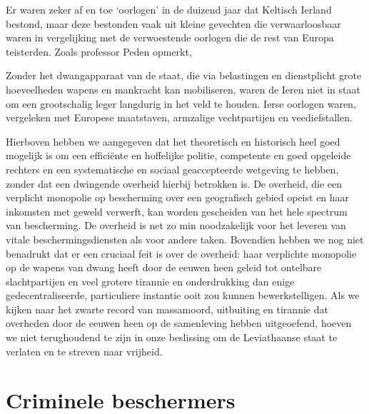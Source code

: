 \documentclass[
  a5paper,
  smalldemyvopaper,10pt,twoside,onecolumn,openright,extrafontsizes,hidelinks]{memoir}
\renewenvironment{quote}%
               {\list{}{\rightmargin=.6cm\leftmargin=.6cm}%
                \itshape \item[]}%
               {\endlist}
\begin{document}
Er waren zeker af en toe `oorlogen' in de duizend jaar dat Keltisch
Ierland bestond, maar deze bestonden vaak uit kleine gevechten die
verwaarloosbaar waren in vergelijking met de verwoestende oorlogen die
de rest van Europa teisterden. Zoals professor Peden opmerkt,

\begin{quote}
Zonder het dwangapparaat van de staat, die via belastingen en
dienstplicht grote hoeveelheden wapens en mankracht kan mobiliseren,
waren de Ieren niet in staat om een grootschalig leger langdurig in het
veld te houden. Ierse oorlogen waren, vergeleken met Europese
maatstaven, armzalige vechtpartijen en veediefstallen.
\end{quote}

Hierboven hebben we aangegeven dat het theoretisch en historisch heel
goed mogelijk is om een efficiënte en hoffelijke politie, competente en
goed opgeleide rechters en een systematische en sociaal geaccepteerde
wetgeving te hebben, zonder dat een dwingende overheid hierbij betrokken
is. De overheid, die een verplicht monopolie op bescherming over een
geografisch gebied opeist en haar inkomsten met geweld verwerft, kan
worden gescheiden van het hele spectrum van bescherming. De overheid is
net zo min noodzakelijk voor het leveren van vitale beschermingsdiensten
als voor andere taken. Bovendien hebben we nog niet benadrukt dat er een
cruciaal feit is over de overheid: haar verplichte monopolie op de
wapens van dwang heeft door de eeuwen heen geleid tot ontelbare
slachtpartijen en veel grotere tirannie en onderdrukking dan enige
gedecentraliseerde, particuliere instantie ooit zou kunnen
bewerkstelligen. Als we kijken naar het zwarte record van massamoord,
uitbuiting en tirannie dat overheden door de eeuwen heen op de
samenleving hebben uitgeoefend, hoeven we niet terughoudend te zijn in
onze beslissing om de Leviathaanse staat te verlaten en te streven naar
vrijheid.

\section{Criminele beschermers}\label{criminele-beschermers}
\end{document}
